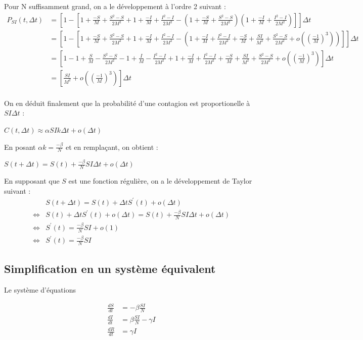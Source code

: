 \documentclass[a4paper]{article}
\theoremstyle{plain}
\theoremstyle{definition}
\theoremstyle{remark}
\begin{document}
Pour N suffisamment grand, on a le développement à l'ordre 2 suivant :
\begin{align*}
P_{SI}(t, \Delta t) &=[1 - [1 + \frac{-S}{M}+\frac{S^2-S}{2M^2}+1+\frac{-I}{M}+\frac{I^2-I}{2M^2}-(1+\frac{-S}{M}+\frac{S^2-S}{2M^2})(1+\frac{-I}{M}+\frac{I^2-I}{2M^2})]]\Delta t \\
&= [1 - [1 + \frac{-S}{M}+\frac{S^2-S}{2M^2}+1+\frac{-I}{M}+\frac{I^2-I}{2M^2}-(1+\frac{-I}{M}+\frac{I^2-I}{2M^2} +\frac{-S}{M}+ \frac{SI}{M^2}+\frac{S^2-S}{2M^2} + o((\frac{-1}{M})^3))]]\Delta t \\
&= [1 - 1 + \frac{S}{M} - \frac{S^2-S}{2M^2} - 1+\frac{I}{M} - \frac{I^2-I}{2M^2} +1+\frac{-I}{M}+\frac{I^2-I}{2M^2} +\frac{-S}{M}+ \frac{SI}{M^2}+\frac{S^2-S}{2M^2} + o((\frac{-1}{M})^3)]\Delta t \\
&=[\frac{SI}{M^2} +o((\frac{-1}{M})^3)] \Delta t\\
\end{align*}

On en déduit finalement que la probabilité d'une contagion est proportionelle à $SI \Delta t$ : 
\begin{center}
    $C(t, \Delta t) \approx \alpha SIk \Delta t +  o(\Delta t)$
\end{center}
En posant $\alpha k = \frac{- \beta}{N}$ et en remplaçant, on obtient : 
\begin{center}
    $S(t+\Delta t) = S(t) + \frac{- \beta}{N}SI\Delta t + o(\Delta t)$
\end{center}
En supposant que $S$ est une fonction régulière, on a le développement de Taylor suivant :
\begin{align*}
    &S(t + \Delta t) =  S(t) + \Delta t  S^{'}(t)+o(\Delta t)\\
    \Leftrightarrow &S(t) + \Delta t S^{'}(t) + o(\Delta t)= S(t) + \frac{- \beta}{N}SI\Delta t + o(\Delta t)\\
    \Leftrightarrow &S^{'}(t) = \frac{- \beta}{N}SI + o(1)\\
    \Leftrightarrow &S^{'}(t) = \frac{- \beta}{N}SI 
\end{align*}
    


\subsection{Simplification en un système équivalent}
Le système d'équations 

\begin{align*}
\frac{dS}{dt}&= -\beta\frac{SI}{N} \\
\frac{dI}{dt}&= \beta\frac{SI}{N} - \gamma I \\
\frac{dR}{dt}&= \gamma I
\end{align*}
\end{document}
